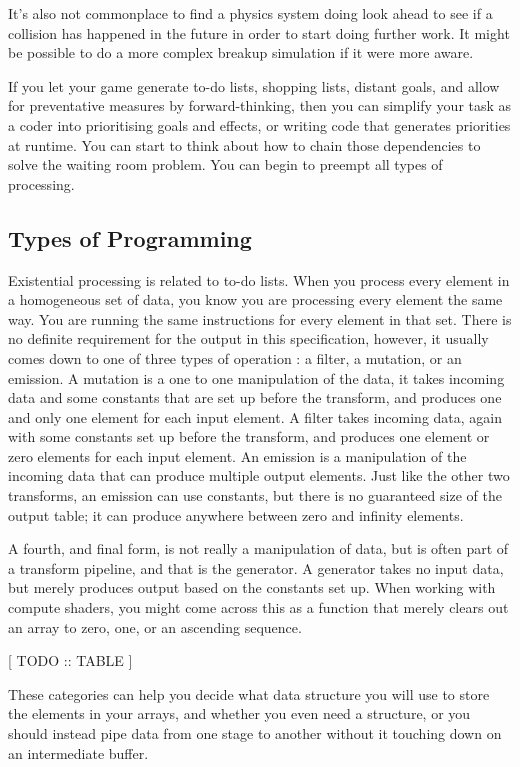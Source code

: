 \documentclass[a4paper,12pt]{book}
\begin{document}
It's also not commonplace to find a physics system doing look ahead to see if a collision has happened in the future in order to start doing further work.
It might be possible to do a more complex breakup simulation if it were more aware.

If you let your game generate to-do lists, shopping lists, distant goals, and allow for preventative measures by forward-thinking, then you can simplify your task as a coder into prioritising goals and effects, or writing code that generates priorities at runtime.
You can start to think about how to chain those dependencies to solve the waiting room problem.
You can begin to preempt all types of processing.

\subsection{Types of Programming}

Existential processing is related to to-do lists.
When you process every element in a homogeneous set of data, you know you are processing every element the same way.
You are running the same instructions for every element in that set.
There is no definite requirement for the output in this specification, however, it usually comes down to one of three types of operation :
a filter, a mutation, or an emission.
A mutation is a one to one manipulation of the data, it takes incoming data and some constants that are set up before the transform, and produces one and only one element for each input element.
A filter takes incoming data, again with some constants set up before the transform, and produces one element or zero elements for each input element.
An emission is a manipulation of the incoming data that can produce multiple output elements.
Just like the other two transforms, an emission can use constants, but there is no guaranteed size of the output table;
it can produce anywhere between zero and infinity elements.

A fourth, and final form, is not really a manipulation of data, but is often part of a transform pipeline, and that is the generator.
A generator takes no input data, but merely produces output based on the constants set up.
When working with compute shaders, you might come across this as a function that merely clears out an array to zero, one, or an ascending sequence.

[ TODO :: TABLE ]

These categories can help you decide what data structure you will use to store the elements in your arrays, and whether you even need a structure, or you should instead pipe data from one stage to another without it touching down on an intermediate buffer.
\end{document}
